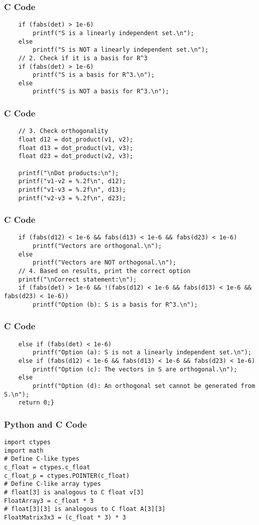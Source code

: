 \documentclass{beamer}
\begin{document}
\begin{frame}[fragile]
\frametitle{C Code}
\begin{lstlisting}
    if (fabs(det) > 1e-6)
        printf("S is a linearly independent set.\n");
    else
        printf("S is NOT a linearly independent set.\n");
    // 2. Check if it is a basis for R^3
    if (fabs(det) > 1e-6)
        printf("S is a basis for R^3.\n");
    else
        printf("S is NOT a basis for R^3.\n");
\end{lstlisting}
\end{frame}

\begin{frame}[fragile]
\frametitle{C Code}
\begin{lstlisting}
    // 3. Check orthogonality
    float d12 = dot_product(v1, v2);
    float d13 = dot_product(v1, v3);
    float d23 = dot_product(v2, v3);

    printf("\nDot products:\n");
    printf("v1·v2 = %.2f\n", d12);
    printf("v1·v3 = %.2f\n", d13);
    printf("v2·v3 = %.2f\n", d23);
\end{lstlisting}
\end{frame}

\begin{frame}[fragile]
\frametitle{C Code}
\begin{lstlisting}
    if (fabs(d12) < 1e-6 && fabs(d13) < 1e-6 && fabs(d23) < 1e-6)
        printf("Vectors are orthogonal.\n");
    else
        printf("Vectors are NOT orthogonal.\n");
    // 4. Based on results, print the correct option
    printf("\nCorrect statement:\n");
    if (fabs(det) > 1e-6 && !(fabs(d12) < 1e-6 && fabs(d13) < 1e-6 && fabs(d23) < 1e-6))
        printf("Option (b): S is a basis for R^3.\n");
\end{lstlisting}
\end{frame}

\begin{frame}[fragile]
\frametitle{C Code}
\begin{lstlisting}
    else if (fabs(det) < 1e-6)
        printf("Option (a): S is not a linearly independent set.\n");
    else if (fabs(d12) < 1e-6 && fabs(d13) < 1e-6 && fabs(d23) < 1e-6)
        printf("Option (c): The vectors in S are orthogonal.\n");
    else
        printf("Option (d): An orthogonal set cannot be generated from S.\n");
    return 0;}
\end{lstlisting}
\end{frame}

\begin{frame}[fragile]
\frametitle{Python and C Code}
\begin{lstlisting}
import ctypes
import math
# Define C-like types
c_float = ctypes.c_float
c_float_p = ctypes.POINTER(c_float)
# Define C-like array types
# float[3] is analogous to C float v[3]
FloatArray3 = c_float * 3
# float[3][3] is analogous to C float A[3][3]
FloatMatrix3x3 = (c_float * 3) * 3
\end{lstlisting}
\end{frame}
\end{document}
